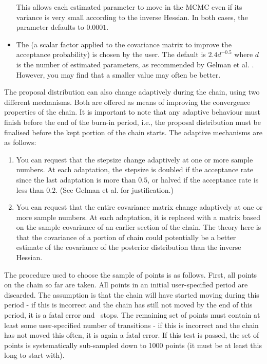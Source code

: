 \begin{itemize}
This allows each estimated parameter to move in the MCMC even if its variance is very small according to the inverse Hessian. In both cases, the  parameter defaults to $0.0001$.

\item The  (a scalar factor applied to the covariance matrix to improve the acceptance probability) is chosen by the user. The default is $2.4d^{-0.5}$ where $d$ is the number of estimated parameters, as recommended by Gelman et al. \citep{823}. However, you may find that a smaller value may often be better. 
\end{itemize}

The proposal distribution can also change adaptively during the chain, using two different mechanisms. Both are offered as means of improving the convergence properties of the chain. It is important to note that any adaptive behaviour must finish before the end of the burn-in period, i.e., the proposal distribution must be finalised before the kept portion of the chain starts. The adaptive mechanisms are as follows: 

\begin{enumerate}
\item You can request that the stepsize change adaptively at one or more sample numbers. At each adaptation, the stepsize is doubled if the acceptance rate since the last adaptation is more than $0.5$, or halved if the acceptance rate is less than $0.2$. (See Gelman et al. \citep{823} for justification.)

\item You can request that the entire covariance matrix change adaptively at one or more sample numbers. At each adaptation, it is replaced with a matrix based on the sample covariance of an earlier section of the chain. The theory here is that the covariance of a portion of chain could potentially be a better estimate of the covariance of the posterior distribution than the inverse Hessian. \COO
\end{enumerate}

The procedure used to choose the sample of points is as follows. First, all points on the chain so far are taken. All points in an initial user-specified period are discarded. The assumption is that the chain will have started moving during this period - if this is incorrect and the chain has still not moved by the end of this period, it is a fatal error and \CNAME\ stops. The remaining set of points must contain at least some user-specified number of transitions - if this is incorrect and the chain has not moved this often, it is again a fatal error. If this test is passed, the set of points is systematically sub-sampled down to 1000 points (it must be at least this long to start with). \COO

